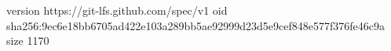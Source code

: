version https://git-lfs.github.com/spec/v1
oid sha256:9ec6e18bb6705ad422e103a289bb5ae92999d23d5e9cef848e577f376fe46c9a
size 1170
